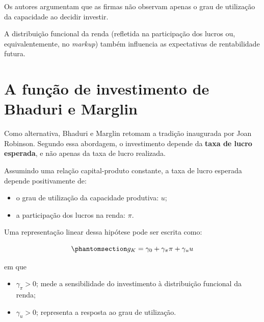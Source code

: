 \documentclass[
  brazilian,
  letterpaper,
  DIV=11,
  numbers=noendperiod]{scrreprt}
\providecommand{\tightlist}{%
  \setlength{\itemsep}{0pt}\setlength{\parskip}{0pt}}
\begin{document}
\begin{tcolorbox}[enhanced jigsaw, arc=.35mm, bottomrule=.15mm, bottomtitle=1mm, breakable, colback=white, colbacktitle=quarto-callout-important-color!10!white, colframe=quarto-callout-important-color-frame, coltitle=black, left=2mm, leftrule=.75mm, opacityback=0, opacitybacktitle=0.6, rightrule=.15mm, title=\textcolor{quarto-callout-important-color}{\faExclamation}\hspace{0.5em}{A crítica de Bhaduri e Marglin}, titlerule=0mm, toprule=.15mm, toptitle=1mm]

Os autores argumentam que as firmas não observam apenas o grau de
utilização da capacidade ao decidir investir.

A distribuição funcional da renda (refletida na participação dos lucros
ou, equivalentemente, no \emph{markup}) também influencia as
expectativas de rentabilidade futura.

\end{tcolorbox}

\section{A função de investimento de Bhaduri e
Marglin}\label{sec-investimento-bm}

Como alternativa, Bhaduri e Marglin retomam a tradição inaugurada por
Joan Robinson. Segundo essa abordagem, o investimento depende da
\textbf{taxa de lucro esperada}, e não apenas da taxa de lucro
realizada.

Assumindo uma relação capital-produto constante, a taxa de lucro
esperada depende positivamente de:

\begin{itemize}
\tightlist
\item
  o grau de utilização da capacidade produtiva: \(u\);
\item
  a participação dos lucros na renda: \(\pi\).
\end{itemize}

Uma representação linear dessa hipótese pode ser escrita como:

\begin{equation}\protect\phantomsection\label{eq-gkbm}{g_K= \gamma_0 + \gamma_{\pi}\pi + \gamma_u u}\end{equation}

em que

\begin{itemize}
\tightlist
\item
  \(\gamma_{\pi}>0\); mede a sensibilidade do investimento à
  distribuição funcional da renda;
\item
  \(\gamma_u>0\); representa a resposta ao grau de utilização.
\end{itemize}
\end{document}
